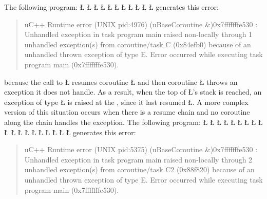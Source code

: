 \documentclass[openright,twoside]{report}
\begin{document}
The following program:
\LGinlinefalse\LGbegin\lgrinde
\L{}
\L{\LB{}}
\L{}
\L{\LB{}}
\L{}
\L{\LB{}}
\L{\LB{\};}}
\L{}
\L{\LB{}}
\L{\LB{}}
\CE{}\L{\LB{\}}}
\endlgrinde\LGend
generates this error:
\begin{quote}
\BGfont
uC++ Runtime error (UNIX pid:4976) (uBaseCoroutine \&)0x7fffffffe530 : Unhandled exception in task program main raised non-locally through 1 unhandled exception(s)
from coroutine/task C (0x84efb0) because of an unhandled thrown exception of type E.
Error occurred while executing task program main (0x7fffffffe530).
\end{quote}
because the call to \LGinlinetrue\LGbegin\lgrinde\L{}\endlgrinde\LGend{} resumes coroutine \LGinlinetrue\LGbegin\lgrinde\L{}\endlgrinde\LGend{} and then coroutine \LGinlinetrue\LGbegin\lgrinde\L{}\endlgrinde\LGend{} throws an exception it does not handle.
As a result, when the top of \LGinlinetrue\LGbegin\lgrinde\L{}\endlgrinde\LGend{}'s stack is reached, an exception of type \LGinlinetrue\LGbegin\lgrinde\L{}\endlgrinde\LGend{} is raised at the , since it last resumed \LGinlinetrue\LGbegin\lgrinde\L{}\endlgrinde\LGend{}.
A more complex version of this situation occurs when there is a resume chain and no coroutine along the chain handles the exception.
The following program:
\LGinlinefalse\LGbegin\lgrinde
\L{}
\L{\LB{}}
\L{}
\L{\LB{}}
\L{}
\L{\LB{}}
\L{\LB{\};}}
\L{}
\L{\LB{}}
\L{\LB{}}
\L{\LB{}}
\L{\LB{}}
\L{}
\L{\LB{}}
\L{\LB{\};}}
\L{}
\L{\LB{}}
\L{\LB{}}
\CE{}\L{\LB{\}}}
\endlgrinde\LGend
generates this error:
\begin{quote}
\BGfont
uC++ Runtime error (UNIX pid:5375) (uBaseCoroutine \&)0x7fffffffe530 : Unhandled exception in task program main raised non-locally through 2 unhandled exception(s)
from coroutine/task C2 (0x88f820) because of an unhandled thrown exception of type E.
Error occurred while executing task program main (0x7fffffffe530).
\end{quote}
\end{document}
